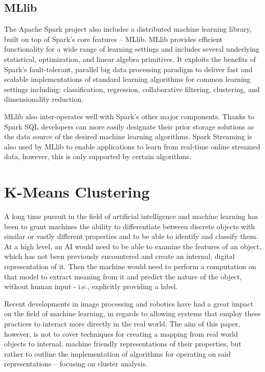 \documentclass{l4proj}
\begin{document}
\section{MLlib}

The Apache Spark project also includes a distributed machine learning library, built on top of Spark's core features -- MLlib. MLlib provides efficient functionality for a wide range of learning settings and includes several underlying statistical, optimization,
and linear algebra primitives. It exploits the benefits of Spark's fault-tolerant, parallel big data processing paradigm to deliver fast and scalable implementations of standard learning algorithms for common learning settings including:  classification, regression, collaborative filtering, clustering, and dimensionality reduction\cite{MLlib}.

MLlib also inter-operates well with Spark's other major components. Thanks to Spark SQL\cite{SQL} developers can more easily designate their prior storage solutions as the data source of the desired machine learning algorithms. Spark Streaming is also used by MLlib to enable applications to learn from real-time online streamed data, however, this is only supported by certain algorithms.


\chapter{K-Means Clustering}
\label{kmeans}

A long time pursuit in the field of artificial intelligence and machine learning has been to grant machines the ability to differentiate between discrete objects with similar or vastly different properties and to be able to identify and classify them. At a high level, an AI would need to be able to examine the features of an object, which has not been previously encountered and create an internal, digital representation of it. Then the machine would need to perform a computation on that model to extract meaning from it and predict the nature of the object, without human input - i.e., explicitly providing a label.

Recent developments in image processing and robotics have had a great impact on the field of machine learning, in regards to allowing systems that employ these practices to interact more directly in the real world. The aim of this paper, however, is not to cover techniques for creating a mapping from real world objects to internal, machine friendly representations of their properties, but rather to outline the implementation of algorithms for operating on said representations -- focusing on cluster analysis.
\end{document}
